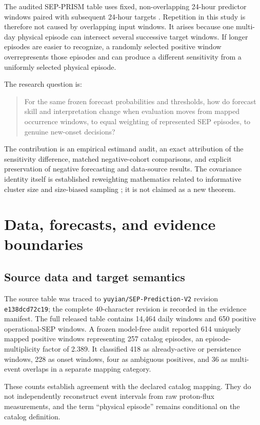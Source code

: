 \documentclass[11pt]{article}
\begin{document}
The audited SEP-PRISM table uses fixed, non-overlapping 24-hour predictor windows paired with subsequent 24-hour targets \cite{sepprism2026}. Repetition in this study is therefore not caused by overlapping input windows. It arises because one multi-day physical episode can intersect several successive target windows. If longer episodes are easier to recognize, a randomly selected positive window overrepresents those episodes and can produce a different sensitivity from a uniformly selected physical episode.

The research question is:

\begin{quote}
For the same frozen forecast probabilities and thresholds, how do forecast skill and interpretation change when evaluation moves from mapped occurrence windows, to equal weighting of represented SEP episodes, to genuine new-onset decisions?
\end{quote}

The contribution is an empirical estimand audit, an exact attribution of the sensitivity difference, matched negative-cohort comparisons, and explicit preservation of negative forecasting and data-source results. The covariance identity itself is established reweighting mathematics related to informative cluster size and size-biased sampling \cite{nevalainen2014,frank2012}; it is not claimed as a new theorem.

\section{Data, forecasts, and evidence boundaries}

\subsection{Source data and target semantics}

The source table was traced to \texttt{yuyian/SEP-Prediction-V2} revision \texttt{e138dcd72c19}; the complete 40-character revision is recorded in the evidence manifest. The full released table contains 14,464 daily windows and 650 positive operational-SEP windows. A frozen model-free audit reported 614 uniquely mapped positive windows representing 257 catalog episodes, an episode-multiplicity factor of 2.389. It classified 418 as already-active or persistence windows, 228 as onset windows, four as ambiguous positives, and 36 as multi-event overlaps in a separate mapping category.

These counts establish agreement with the declared catalog mapping. They do not independently reconstruct event intervals from raw proton-flux measurements, and the term ``physical episode'' remains conditional on the catalog definition.
\end{document}
